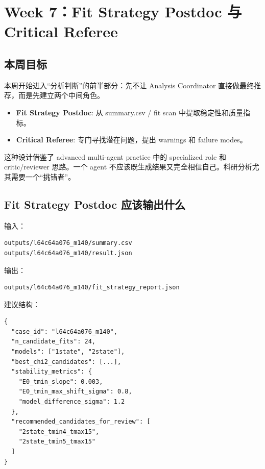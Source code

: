 \documentclass[11pt,a4paper,fontset=none]{ctexart}
\begin{document}
\newpage

\section{Week 7：Fit Strategy Postdoc 与 Critical Referee}

\subsection{本周目标}

本周开始进入“分析判断”的前半部分：先不让 Analysis Coordinator 直接做最终推荐，而是先建立两个中间角色。

\begin{itemize}[leftmargin=2em]
  \item \textbf{Fit Strategy Postdoc}: 从 summary.csv / fit scan 中提取稳定性和质量指标。
  \item \textbf{Critical Referee}: 专门寻找潜在问题，提出 warnings 和 failure modes。
\end{itemize}

这种设计借鉴了 advanced multi-agent practice 中的 specialized role 和 critic/reviewer 思路。一个 agent 不应该既生成结果又完全相信自己。科研分析尤其需要一个“挑错者”。

\subsection{Fit Strategy Postdoc 应该输出什么}

输入：

\begin{lstlisting}
outputs/l64c64a076_m140/summary.csv
outputs/l64c64a076_m140/result.json
\end{lstlisting}

输出：

\begin{lstlisting}
outputs/l64c64a076_m140/fit_strategy_report.json
\end{lstlisting}

建议结构：

\begin{lstlisting}
{
  "case_id": "l64c64a076_m140",
  "n_candidate_fits": 24,
  "models": ["1state", "2state"],
  "best_chi2_candidates": [...],
  "stability_metrics": {
    "E0_tmin_slope": 0.003,
    "E0_tmin_max_shift_sigma": 0.8,
    "model_difference_sigma": 1.2
  },
  "recommended_candidates_for_review": [
    "2state_tmin4_tmax15",
    "2state_tmin5_tmax15"
  ]
}
\end{lstlisting}
\end{document}
